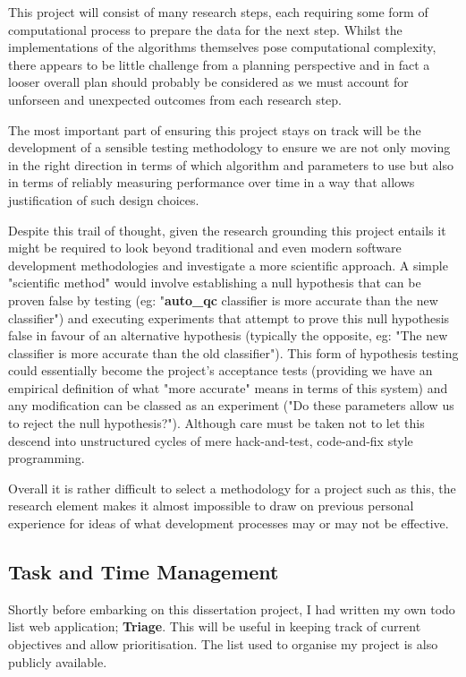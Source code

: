 This project will consist of many research steps, each requiring some form of
computational process to prepare the data for the next step. Whilst the
implementations of the algorithms themselves pose computational complexity,
there appears to be little challenge from a planning perspective and in fact a
looser overall plan should probably be considered as we must account for
unforseen and unexpected outcomes from each research step.

The most important part of ensuring this project stays on track will be the
development of a sensible testing methodology to ensure we are not only moving
in the right direction in terms of which algorithm and parameters to use but
also in terms of reliably measuring performance over time in a way that allows
justification of such design choices.

Despite this trail of thought, given the research grounding this project entails
it might be required to look beyond traditional and even modern software
development methodologies and investigate a more scientific approach. A simple
"scientific method" would involve establishing a null hypothesis that can be
proven false by testing (eg: "\textbf{auto\_qc} classifier is more
accurate than the new classifier") and executing experiments that
attempt to prove this null hypothesis false in favour of an alternative
hypothesis (typically the opposite, eg: "The new classifier is more
accurate than the old classifier"). This form of hypothesis testing
could essentially become the project's acceptance tests (providing we have an
empirical definition of what "more accurate" means in terms of this
system) and any modification can be classed as an experiment ("Do these
parameters allow us to reject the null hypothesis?").  Although care must be
taken not to let this descend into unstructured cycles of mere hack-and-test,
code-and-fix style programming.

Overall it is rather difficult to select a methodology for a project such as
this, the research element makes it almost impossible to draw on previous
personal experience for ideas of what development processes may or may not be
effective.

\subsection{Task and Time Management}
Shortly before embarking on this dissertation project, I had written my own todo
list web application; \textbf{Triage}\citep{github:triage}. This will be useful
in keeping track of current objectives and allow prioritisation. The list used to
organise my project is also publicly available\citep{sam:triage}.

